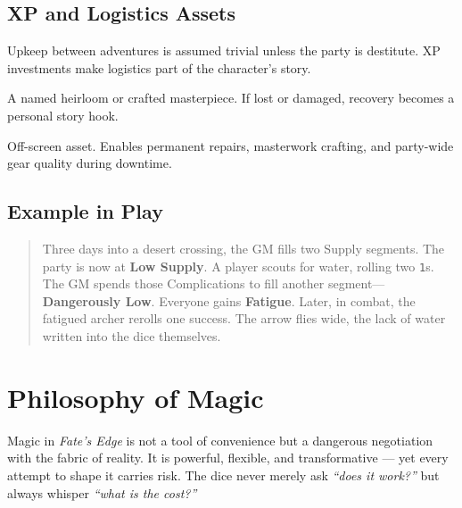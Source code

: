 \documentclass[12pt]{book}
\begin{document}
\section{XP and Logistics Assets}
Upkeep between adventures is assumed trivial unless the party is destitute.
XP investments make logistics part of the character’s story.

\begin{description}[leftmargin=2cm]
  \item[4 XP: Signature Weapon] A named heirloom or crafted masterpiece.
    If lost or damaged, recovery becomes a personal story hook.
  \item[8 XP: Superior Workshop] Off-screen asset. Enables permanent repairs,
    masterwork crafting, and party-wide gear quality during downtime.
\end{description}

\section{Example in Play}
\begin{quote}
Three days into a desert crossing, the GM fills two Supply segments. The party
is now at \textbf{Low Supply}.  
A player scouts for water, rolling two \texttt{1}s. The GM spends those
Complications to fill another segment—\textbf{Dangerously Low}. Everyone gains
\textbf{Fatigue}.  
Later, in combat, the fatigued archer rerolls one success. The arrow flies wide,
the lack of water written into the dice themselves.
\end{quote}

\chapter{Philosophy of Magic}

Magic in \textit{Fate’s Edge} is not a tool of convenience but a dangerous negotiation with the fabric of reality.  
It is powerful, flexible, and transformative — yet every attempt to shape it carries risk. The dice never merely ask \emph{“does it work?”} but always whisper \emph{“what is the cost?”}
\end{document}
